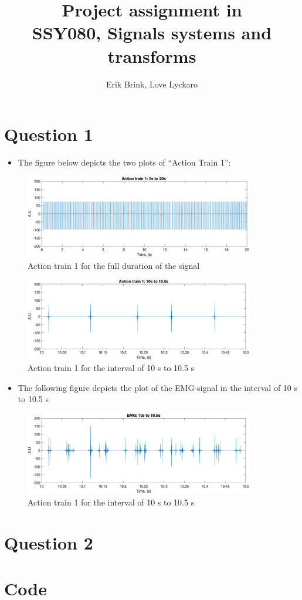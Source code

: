 \documentclass[a4paper, 12pt]{article}
\title{Project assignment in\\
       SSY080, Signals systems and transforms}
\author{Erik Brink, Love Lyckaro}
\begin{document}
\maketitle
{}
\newpage
{}

\section*{Question 1}
  \begin{itemize}
    \item The figure below depicts the two plots of ``Action Train 1'':
  \end{itemize}
  \begin{figure}[H]
    \centering
    \includegraphics[width= 10cm]{at1_0to20.png}
    \caption{Action train 1 for the full duration of the signal}
  \end{figure}
  \begin{figure}[H]
    \centering
    \includegraphics[width= 10cm]{at1_10to105.png}
    \caption{Action train 1 for the interval of 10 s to 10.5 s}
  \end{figure}
  \begin{itemize}
    \item The following figure depicts the plot of the EMG-signal in the interval of 10 s to 10.5 s
  \end{itemize}
  \begin{figure}[H]
    \centering
    \includegraphics[width= 10cm]{emg_10to105.png}
    \caption{Action train 1 for the interval of 10 s to 10.5 s}
  \end{figure}

\newpage
\section*{Question 2}

\newpage
{}
\section{Code}
    
\end{document}

